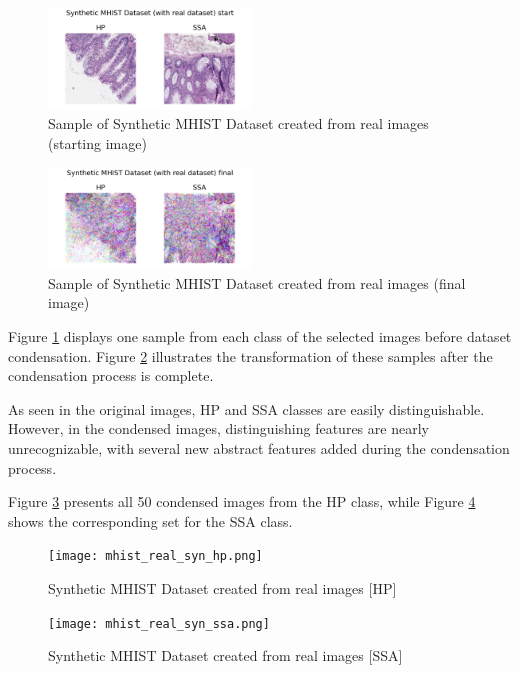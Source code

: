 \documentclass[conference, compsoc]{IEEEtran}
\begin{document}
	
	\begin{figure}[H]
		\centering
		\includegraphics[width=0.48\textwidth]{mhist_real_sample.png}
		\caption{Sample of Synthetic MHIST Dataset created from real images (starting image)}
		\label{fig:mhist_real_sample}
	\end{figure}
	\begin{figure}[H]
		\centering
		\includegraphics[width=0.48\textwidth]{mhist_real_syn.png}
		\caption{Sample of Synthetic MHIST Dataset created from real images (final image)}
		\label{fig:mhist_real_final}
	\end{figure}
	
	Figure \ref{fig:mhist_real_sample} displays one sample from each class of the selected images before dataset condensation. Figure \ref{fig:mhist_real_final} illustrates the transformation of these samples after the condensation process is complete.
	
	As seen in the original images, HP and SSA classes are easily distinguishable. However, in the condensed images, distinguishing features are nearly unrecognizable, with several new abstract features added during the condensation process.
	
	Figure \ref{fig:mhist_real_syn_hp} presents all 50 condensed images from the HP class, while Figure \ref{fig:mhist_real_syn_ssa} shows the corresponding set for the SSA class.
	
	\vfill
	\begin{figure}[H]
		\centering
		\texttt{[image: mhist\_real\_syn\_hp.png]}
		\caption{Synthetic MHIST Dataset created from real images [HP]}
		\label{fig:mhist_real_syn_hp}
	\end{figure}
	
	\begin{figure}[H]
		\centering
		\texttt{[image: mhist\_real\_syn\_ssa.png]}
		\caption{Synthetic MHIST Dataset created from real images [SSA]}
		\label{fig:mhist_real_syn_ssa}
	\end{figure}
	\vfill
	
\end{document}
